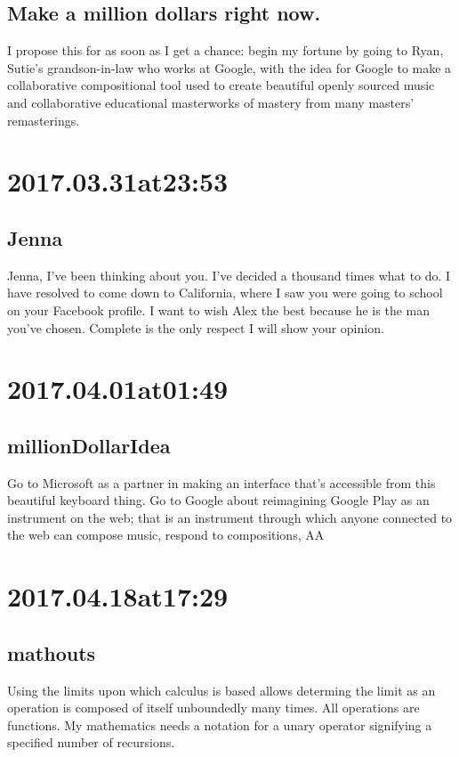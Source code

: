 \begin{enumerate}
\begin{enumerate}
\subsection*{ Make a million dollars right now. }
I propose this for as soon as I get a chance: begin my fortune by going to Ryan, Sutie's grandson-in-law who works at Google, with the idea for Google to make a collaborative compositional tool used to create beautiful openly sourced music and collaborative educational masterworks of mastery from many masters' remasterings.

\section*{ 2017.03.31at23:53 }
\subsection*{ Jenna }
Jenna, I've been thinking about you.
I've decided a thousand times what to do.
I have resolved to come down to California, where I saw you were going to school on your Facebook profile.
I want to wish Alex the best because he is the man you've chosen.
Complete is the only respect I will show your opinion.

\section*{ 2017.04.01at01:49 }
\subsection*{ millionDollarIdea }
Go to Microsoft as a partner in making an interface that's accessible from this beautiful keyboard thing.
Go to Google about reimagining Google Play as an instrument on the web;
that is an instrument through which anyone connected to the web can compose music, respond to compositions, AA

\section*{ 2017.04.18at17:29 }
\subsection*{ mathouts }
Using the limits upon which calculus is based allows determing the limit as an operation is composed of itself unboundedly many times.
All operations are functions.
My mathematics needs a notation for a unary operator signifying a specified number of recursions.


\end{enumerate}
\end{enumerate}
